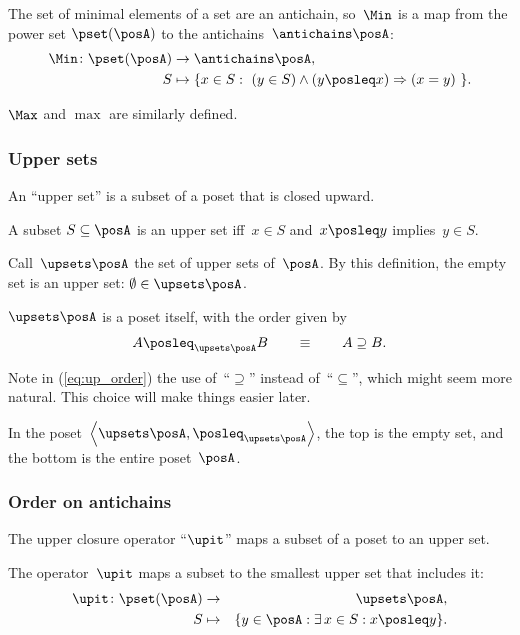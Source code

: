 The set of minimal elements of a set are an antichain, so~$\Min$
is a map from the power set $\pset(\posA)$ to the antichains~$\antichains\posA$:
\begin{align*}
\Min\colon\pset(\posA) & \rightarrow\antichains\posA,\\
S & \mapsto\{x\in S:\ (y\in S)\wedge(y\posleq x)\Rightarrow(x=y)\ \}.
\end{align*}

$\Max$ and $\max$ are similarly defined.

\subsubsection{Upper sets}

An ``upper set'' is a subset of a poset that is closed upward.

\begin{definition}
A subset $S\subseteq\posA$ is an upper set iff~$x\in S$ and~$x\posleq y$
implies~$y\in S$.
\end{definition}
Call~$\upsets\posA$ the set of upper sets of~$\posA$. By this
definition, the empty set is an upper set: $\emptyset\in\upsets\posA$.
\begin{lemma}
$\upsets\posA$ is a poset itself, with the order given by
\begin{equation}
A\posleq_{\upsets\posA}B\qquad\equiv\qquad A\supseteq B.\label{eq:up_order}
\end{equation}
\end{lemma}
Note in (\ref{eq:up_order}) the use of~``$\supseteq$'' instead
of~``$\subseteq$'', which might seem more natural. This choice
will make things easier later.

In the poset~$\left\langle \upsets\posA,\posleq_{\upsets\posA}\right\rangle $,
the top is the empty set, and the bottom is the entire poset~$\posA$.


\subsubsection{Order on antichains}

The upper closure operator ``$\upit$'' maps a subset of a poset
to an upper set.
\begin{definition}
The operator~$\upit$ maps a subset to the smallest upper set that
includes it:
\begin{eqnarray*}
\upit\colon\pset(\posA) & \rightarrow & \upsets\posA,\\
S & \mapsto & \{y\in\posA:\exists\,x\in S:x\posleq y\}.
\end{eqnarray*}
\end{definition}

